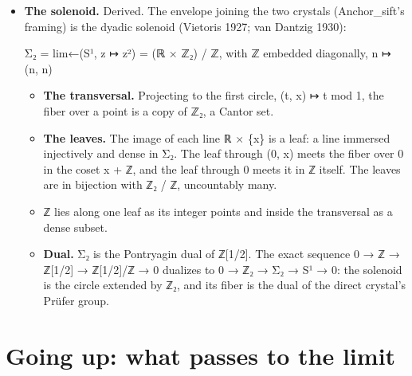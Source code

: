 \begin{itemize}
\begin{itemize}
\item ℤ is countable. ℤ₂ is in bijection with the bit sequences \{0,1\}\textasciicircum{}ℕ and uncountable, by Cantor's diagonal. ℤ₂ \textbackslash{} ℤ is uncountable.
\item Its part in ℚ, the rationals with odd denominators outside ℤ, is countable: the eventually periodic expansions. The machine reaches their windows through the exact quotient's inverse (1/3, above).
\item The computable elements of ℤ₂ are countable, and a program can produce any window of one. All but countably many elements are not computable: each has a window at every w, as every element does, yet no program produces its windows for every w.
\end{itemize}
\item \textbf{The solenoid.} Derived. The envelope joining the two crystals (Anchor\_\allowbreak{}sift's framing) is the dyadic solenoid (Vietoris 1927; van Dantzig 1930):

Σ₂ = lim←(S¹, z ↦ z²) = (ℝ × ℤ₂) / ℤ, with ℤ embedded diagonally, n ↦ (n, n)

\begin{itemize}
\item \textbf{The transversal.} Projecting to the first circle, (t, x) ↦ t mod 1, the fiber over a point is a copy of ℤ₂, a Cantor set.
\item \textbf{The leaves.} The image of each line ℝ × \{x\} is a leaf: a line immersed injectively and dense in Σ₂. The leaf through (0, x) meets the fiber over 0 in the coset x + ℤ, and the leaf through 0 meets it in ℤ itself. The leaves are in bijection with ℤ₂ / ℤ, uncountably many.
\item ℤ lies along one leaf as its integer points and inside the transversal as a dense subset.
\item \textbf{Dual.} Σ₂ is the Pontryagin dual of ℤ[1/2]. The exact sequence 0 → ℤ → ℤ[1/2] → ℤ[1/2]/ℤ → 0 dualizes to 0 → ℤ₂ → Σ₂ → S¹ → 0: the solenoid is the circle extended by ℤ₂, and its fiber is the dual of the direct crystal's Prüfer group.
\end{itemize}
\end{itemize}

\section{\texorpdfstring{Going up: what passes to the limit}{Going up: what passes to the limit}}

